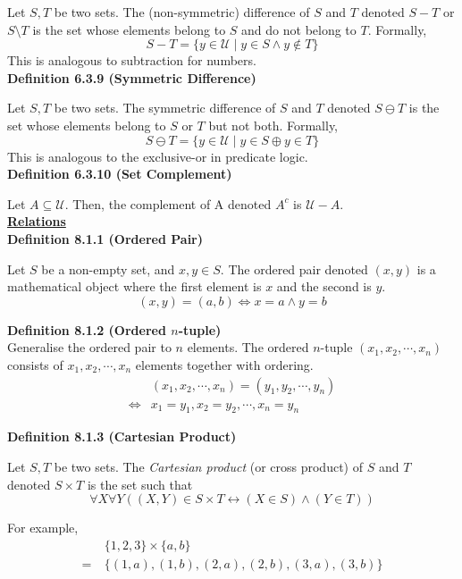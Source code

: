 \documentclass[a4paper]{article}
\newcommand{\heading}[1]{{\small\underline{\textbf{#1}}}}
\newcommand{\subheading}[1]{{\scriptsize\textbf{#1}}}
\begin{document}
\begin{multicols*}{4}
Let $S, T$ be two sets. The (non-symmetric) difference of $S$ and $T$ denoted
$S-T$ or $S\setminus T$ is the set whose elements belong to $S$ and do not
belong to $T$. Formally,
$$S - T = \{y \in \mathcal{U}\;|\;y \in S \land y \not\in T \}$$
This is analogous to subtraction for numbers.\\

\subheading{Definition 6.3.9 (Symmetric Difference)}

Let $S, T$ be two sets. The symmetric difference of $S$ and $T$ denoted $S
\ominus T$ is the set whose elements belong to $S$ or $T$ but not both.
Formally,
$$S \ominus T = \{y \in \mathcal{U}\;|\;y \in S \oplus y \in T \}$$
This is analogous to the exclusive-or in predicate logic.\\

\subheading{Definition 6.3.10 (Set Complement)}

Let $A \subseteq \mathcal{U}$. Then, the complement of A denoted $A^c$ is
$\mathcal{U}-A$.\\

\heading{Relations}\\

\subheading{Definition 8.1.1 (Ordered Pair)}

Let $S$ be a non-empty set, and $x, y \in S$. The ordered pair denoted $(x, y)$
is a mathematical object where the first element is $x$ and the second is $y$.
$$(x, y) = (a, b) \iff x = a \land y = b$$

\subheading{Definition 8.1.2 (Ordered $n$-tuple)} \\

Generalise the ordered pair to $n$ elements. The ordered $n$-tuple $(x_1, x_2,
\cdots, x_n)$ consists of $x_1, x_2, \cdots, x_n$ elements together with
ordering.
\begin{align*}
       &(x_1, x_2, \cdots, x_n) = (y_1, y_2, \cdots, y_n) \\
  \iff &x_1 = y_1, x_2 = y_2, \cdots, x_n = y_n
\end{align*}

\subheading{Definition 8.1.3 (Cartesian Product)}

Let $S, T$ be two sets. The \textit{Cartesian product} (or cross product) of $S$
and $T$ denoted $S \times T$ is the set such that
$$\forall X \forall Y ((X,Y) \in S \times T
  \longleftrightarrow (X \in S) \land (Y \in T))$$

For example,
\begin{align*}
    &\{1, 2, 3\} \times \{a, b\} \\
  =\ &\{(1, a), (1, b), (2, a), (2, b), (3, a), (3, b)\}
\end{align*}


\end{multicols*}
\end{document}
